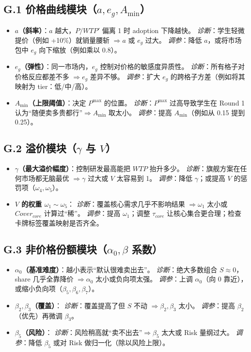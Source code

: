 \documentclass[UTF8,12pt]{ctexart}
\begin{document}
\subsection{G.1 价格曲线模块（$a,e_g,A_{\min}$）}
\begin{itemize}
\item \textbf{$a$（斜率）}：$a$ 越大，$P/WTP'$ 偏离 1 时 adoption 下降越快。
\emph{诊断}：学生轻微提价（例如 +10\%）就销量腰斩 $\Rightarrow a$ 或 $e_g$ 过大。
\emph{调参}：降低 $a$，或将市场包中 $e_g$ 向下缩放（例如乘以 0.8）。
\item \textbf{$e_g$（弹性）}：同一市场内，$e_g$ 控制对价格的敏感度异质性。
\emph{诊断}：所有格子对价格反应都差不多 $\Rightarrow e_g$ 差异不够。
\emph{调参}：扩大 $e_g$ 的跨格子方差（例如将其映射为 tier：低/中/高）。
\item \textbf{$A_{\min}$（上限阈值）}：决定 $P^{\max}$ 的位置。
\emph{诊断}：$P^{\max}$ 过高导致学生在 Round 1 认为“随便卖多贵都行”$\Rightarrow A_{\min}$ 取太小。
\emph{调参}：提高 $A_{\min}$（例如从 0.15 提到 0.25）。
\end{itemize}

\subsection{G.2 溢价模块（$\gamma$ 与 $V$）}
\begin{itemize}
\item \textbf{$\gamma$（最大溢价幅度）}：控制研发最高能把 $WTP$ 抬升多少。
\emph{诊断}：旗舰方案在任何市场都无脑最优 $\Rightarrow \gamma$ 过大或 $V$ 太容易到 1。
\emph{调参}：降低 $\gamma$；或提高 $V$ 的惩罚项（$\omega_4,\omega_5$）。
\item \textbf{$V$ 的权重 $\omega_1\sim\omega_5$}：
\emph{诊断}：覆盖核心需求几乎不影响结果 $\Rightarrow \omega_1$ 太小或 $Cover_{core}$ 计算过“稀”。
\emph{调参}：提高 $\omega_1$；调整 $\tau_{core}$ 让核心集合更合理；检查卡牌标签覆盖映射是否齐全。
\end{itemize}

\subsection{G.3 非价格份额模块（$\alpha_0,\beta$ 系数）}
\begin{itemize}
\item \textbf{$\alpha_0$（基准难度）}：越小表示“默认很难卖出去”。
\emph{诊断}：绝大多数组合 $S\approx 0$，share 几乎全靠降价 $\Rightarrow \alpha_0$ 太小或负向项太强。
\emph{调参}：上调 $\alpha_0$（向 0 靠近），或缩小负向项（$\beta_5,\beta_6,\beta_7$）。
\item \textbf{$\beta_2,\beta_3$（覆盖）}：
\emph{诊断}：覆盖提高了但 $S$ 不动 $\Rightarrow \beta_2,\beta_3$ 太小。
\emph{调参}：提高 $\beta_2$（优先）再微调 $\beta_3$。
\item \textbf{$\beta_5$（风险）}：
\emph{诊断}：风险稍高就“卖不出去”$\Rightarrow \beta_5$ 太大或 Risk 量纲过大。
\emph{调参}：降低 $\beta_5$ 或对 Risk 做归一化（除以风险上限）。
\end{itemize}
\end{document}
